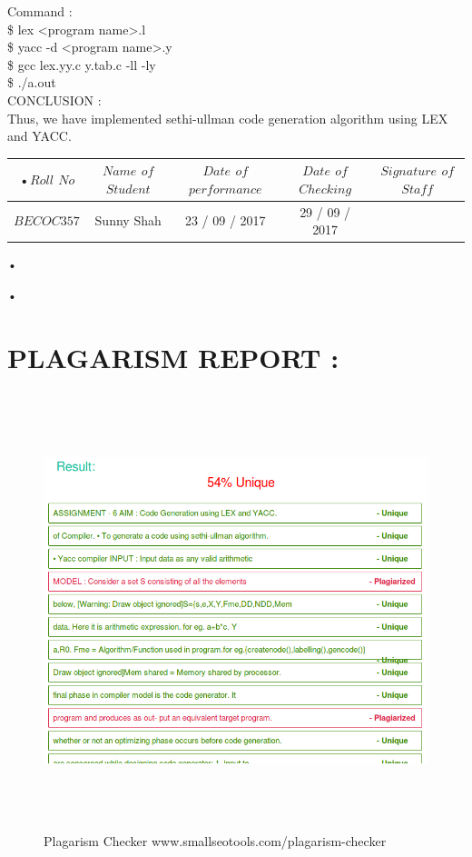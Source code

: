 \documentclass[11pt]{article}
\begin{document}
	\noindent
	Command :\\
	\$ lex <program name>.l\\
	\$ yacc -d <program name>.y\\
	\$ gcc lex.yy.c y.tab.c -ll -ly\\
	\$ ./a.out\\
	
	\noindent
	CONCLUSION :\\
	Thus, we have implemented sethi-ullman code generation algorithm using LEX and YACC.\\
	
	\begin{center}
		\begin{tabular}{|c|c|c|c|c|}
			•$Roll$ $No$ & $Name$ $of$ $Student$ & $Date$ $of$ $performance$ & $Date$ $of$ $Checking$ & $Signature$ $of$ $Staff$ \\ \hline
			$BECOC357$ & Sunny Shah& 23 / 09 / 2017& 29 / 09 / 2017 & \\ \hline
		\end{tabular}•
	\end{center}•
	\newpage
	\section{PLAGARISM REPORT :}
	\begin{figure}[h!]
		\centering
		\includegraphics[height=5in,width=6in]{plagiarism6.png}
		\caption{Plagarism Checker www.smallseotools.com/plagarism-checker}
	\end{figure}
	\newpage
\end{document}
